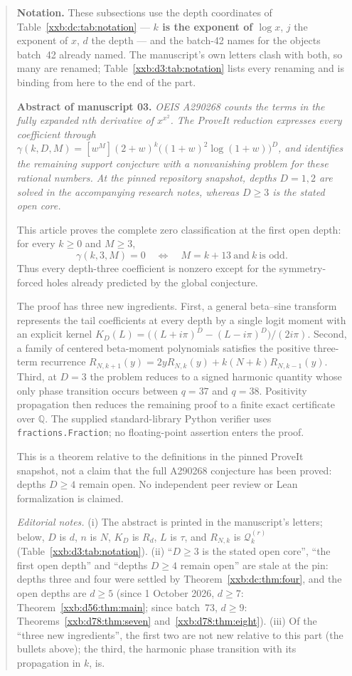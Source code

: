 \documentclass[11pt,a4paper]{article}
\numberwithin{equation}{section}
\theoremstyle{definition}
\theoremstyle{remark}
\theoremstyle{plain}
\newcommand{\Q}{\mathbb Q}
\begin{document}
\begin{quote}
\smallskip
\textbf{Notation.}  These subsections use the depth coordinates of
Table~\ref{xxb:dc:tab:notation} --- \textbf{$k$ is the exponent of $\log x$},
$j$ the exponent of $x$, $d$ the depth --- and the batch-42 names for the
objects batch~42 already named.  The manuscript's own letters clash with
both, so many are renamed; Table~\ref{xxb:d3:tab:notation} lists every
renaming and is binding from here to the end of the part.

\medskip
\textbf{Abstract of manuscript 03.}\itshape
OEIS A290268 counts the terms in the fully expanded $n$th derivative of
$x^{x^2}$.  The ProveIt reduction expresses every coefficient through
$\gamma(k,D,M)=[w^M](2+w)^k\bigl((1+w)^2\log(1+w)\bigr)^D$,
and identifies the remaining support conjecture with a nonvanishing problem
for these rational numbers.  At the pinned repository snapshot, depths
$D=1,2$ are solved in the accompanying research notes, whereas $D\geq3$ is
the stated open core.

This article proves the complete zero classification at the first open depth:
for every $k\geq0$ and $M\geq3$,
\[
  \gamma(k,3,M)=0
  \quad\Longleftrightarrow\quad
  M=k+13\ \text{and}\ k\ \text{is odd}.
\]
Thus every depth-three coefficient is nonzero except for the symmetry-forced
holes already predicted by the global conjecture.

The proof has three new ingredients.  First, a general beta--sine transform
represents the tail coefficients at every depth by a single logit moment with
an explicit kernel
$K_D(L)=\bigl((L+i\pi)^D-(L-i\pi)^D\bigr)/(2i\pi)$.
Second, a family of centered beta-moment polynomials satisfies the positive
three-term recurrence
$R_{N,k+1}(y)=2yR_{N,k}(y)+k(N+k)R_{N,k-1}(y)$.
Third, at $D=3$ the problem reduces to a signed harmonic quantity whose only
phase transition occurs between $q=37$ and $q=38$.  Positivity propagation
then reduces the remaining proof to a finite exact certificate over
$\Q$.  The supplied standard-library Python verifier uses
\texttt{fractions.Fraction}; no floating-point assertion enters the proof.

This is a theorem relative to the definitions in the pinned ProveIt snapshot,
not a claim that the full A290268 conjecture has been proved: depths $D\geq4$
remain open.  No independent peer review or Lean formalization is claimed.
\upshape\par
\smallskip
\emph{Editorial notes.}  (i) The abstract is printed in the manuscript's
letters; below, $D$ is $d$, $n$ is $N$, $K_D$ is $R_d$, $L$ is $\tau$, and
$R_{N,k}$ is $\mathcal Q_k^{(r)}$ (Table~\ref{xxb:d3:tab:notation}).
(ii) ``$D\ge3$ is the stated open core'', ``the first open depth'' and
``depths $D\ge4$ remain open'' are stale at the pin: depths three and four
were settled by Theorem~\ref{xxb:dc:thm:four}, and the open depths are
$d\ge5$ (since 1 October 2026, $d\ge7$: Theorem~\ref{xxb:d56:thm:main}; since
batch~73, $d\ge9$: Theorems~\ref{xxb:d78:thm:seven}
and~\ref{xxb:d78:thm:eight}).
(iii) Of the ``three new ingredients'', the first two are not new
relative to this part (the bullets above); the third, the harmonic phase
transition with its propagation in $k$, is.
\end{quote}
\end{document}
